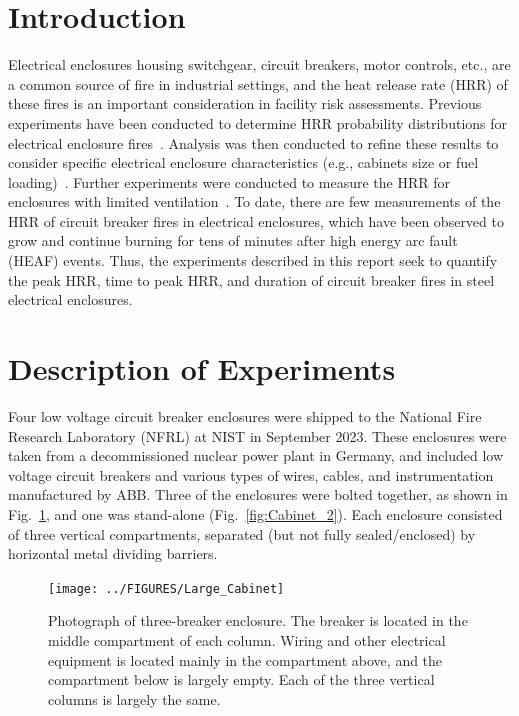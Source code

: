 \documentclass[12pt]{article}
\begin{document}
\pagebreak


\section{Introduction}

Electrical enclosures housing switchgear, circuit breakers, motor controls, etc., are a common source of fire in industrial settings, and the heat release rate (HRR) of these fires is an important consideration in facility risk assessments. Previous experiments have been conducted to determine HRR probability distributions for electrical enclosure fires~\cite{NUREG/CR-7197}. Analysis was then conducted to refine these results to consider specific electrical enclosure characteristics (e.g., cabinets size or fuel loading)~\cite{NUREG-2178}. Further experiments were conducted to measure the HRR for enclosures with limited ventilation~\cite{OLIVE-FIRE}. To date, there are few measurements of the HRR of circuit breaker fires in electrical enclosures, which have been observed to grow and continue burning for tens of minutes after high energy arc fault (HEAF) events. Thus, the experiments described in this report seek to quantify the peak HRR, time to peak HRR, and duration of circuit breaker fires in steel electrical enclosures.


\section{Description of Experiments}

Four low voltage circuit breaker enclosures were shipped to the National Fire Research Laboratory (NFRL) at NIST in September 2023. These enclosures were taken from a decommissioned nuclear power plant in Germany, and included low voltage circuit breakers and various types of wires, cables, and instrumentation manufactured by ABB. Three of the enclosures were bolted together, as shown in Fig.~\ref{fig:Cabinet_1}, and one was stand-alone (Fig.~\ref{fig:Cabinet_2}). Each enclosure consisted of three vertical compartments, separated (but not fully sealed/enclosed) by horizontal metal dividing barriers.

\begin{figure}[ht]
\centering
\texttt{[image: ../FIGURES/Large\_Cabinet]}
\caption[Photograph of three-breaker enclosure] {Photograph of three-breaker enclosure. The breaker is located in the middle compartment of each column. Wiring and other electrical equipment is located mainly in the compartment above, and the compartment below is largely empty. Each of the three vertical columns is largely the same.}
\label{fig:Cabinet_1}
\end{figure}
\end{document}
